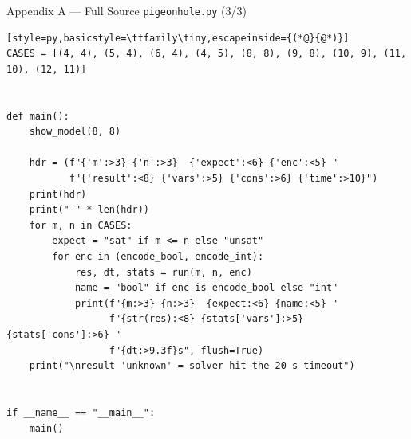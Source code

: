 \documentclass[10pt,aspectratio=169,xcolor={table}]{beamer}
\begin{document}
\begin{frame}[fragile]{Appendix A --- Full Source \texttt{pigeonhole.py} (3/3)}
\begin{lstlisting}[style=py,basicstyle=\ttfamily\tiny,escapeinside={(*@}{@*)}]
CASES = [(4, 4), (5, 4), (6, 4), (4, 5), (8, 8), (9, 8), (10, 9), (11, 10), (12, 11)]


def main():
    show_model(8, 8)

    hdr = (f"{'m':>3} {'n':>3}  {'expect':<6} {'enc':<5} "
           f"{'result':<8} {'vars':>5} {'cons':>6} {'time':>10}")
    print(hdr)
    print("-" * len(hdr))
    for m, n in CASES:
        expect = "sat" if m <= n else "unsat"
        for enc in (encode_bool, encode_int):
            res, dt, stats = run(m, n, enc)
            name = "bool" if enc is encode_bool else "int"
            print(f"{m:>3} {n:>3}  {expect:<6} {name:<5} "
                  f"{str(res):<8} {stats['vars']:>5} {stats['cons']:>6} "
                  f"{dt:>9.3f}s", flush=True)
    print("\nresult 'unknown' = solver hit the 20 s timeout")


if __name__ == "__main__":
    main()
\end{lstlisting}
\end{frame}
\end{document}
